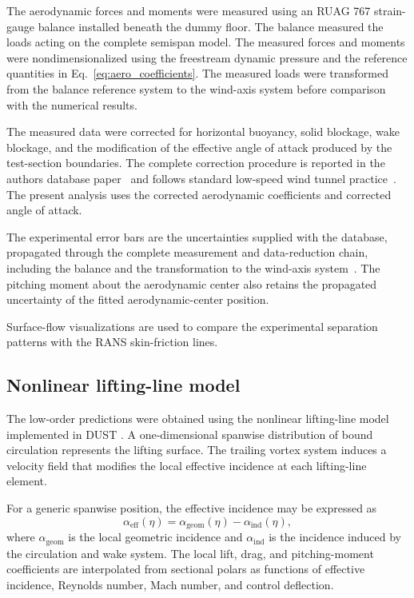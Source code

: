 \documentclass[journal ]{new-aiaa}
\begin{document}
The aerodynamic forces and moments were measured using an RUAG 767 strain-gauge balance installed beneath the dummy floor. The balance measured the loads acting on the complete semispan model. The measured forces and moments were nondimensionalized using the freestream dynamic pressure and the reference quantities in Eq.~\ref{eq:aero_coefficients}. The measured loads were transformed from the balance reference system to the wind-axis system before comparison with the numerical results.

The measured data were corrected for horizontal buoyancy, solid blockage, wake blockage, and the modification of the effective angle of attack produced by the test-section boundaries. The complete correction procedure is reported in the authors\textquotesingle{} database paper~\citep{rausa2026monnalisa} and follows standard low-speed wind tunnel practice~\citep{barlow1999low}. The present analysis uses the corrected aerodynamic coefficients and corrected angle of attack.

The experimental error bars are the uncertainties supplied with the database, propagated through the complete measurement and data-reduction chain, including the balance and the transformation to the wind-axis system~\citep{rausa2026monnalisa}. The pitching moment about the aerodynamic center also retains the propagated uncertainty of the fitted aerodynamic-center position.

Surface-flow visualizations are used to compare the experimental separation patterns with the RANS skin-friction lines.


\subsection{Nonlinear lifting-line model}
\label{sec:lifting_line}

The low-order predictions were obtained using the nonlinear lifting-line model implemented in DUST \citep{TUGNOLI2021106804}. A one-dimensional spanwise distribution of bound circulation represents the lifting surface. The trailing vortex system induces a velocity field that modifies the local effective incidence at each lifting-line element.

For a generic spanwise position, the effective incidence may be expressed as
%
\begin{equation}
\alpha_{\mathrm{eff}}(\eta)
=
\alpha_{\mathrm{geom}}(\eta)
-
\alpha_{\mathrm{ind}}(\eta),
\label{eq:effective_incidence}
\end{equation}
%
where $\alpha_{\mathrm{geom}}$ is the local geometric incidence and $\alpha_{\mathrm{ind}}$ is the incidence induced by the circulation and wake system. The local lift, drag, and pitching-moment coefficients are interpolated from sectional polars as functions of effective incidence, Reynolds number, Mach number, and control deflection.
\end{document}
